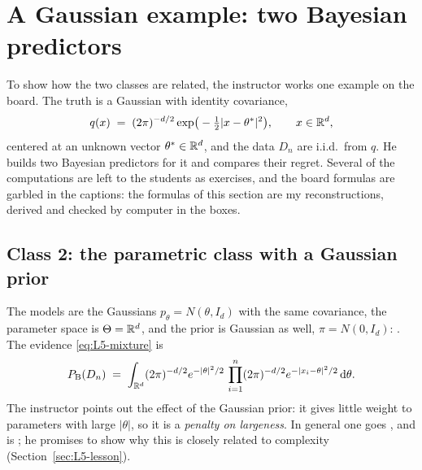 
\section{A Gaussian example: two Bayesian predictors}\label{sec:L5-gauss}
To show how the two classes are related, the instructor works one example on the board. The truth is a Gaussian with identity covariance,
\[
  q(x)\;=\;(2\pi)^{-d/2}\exp\!\big(-\tfrac12|x-\theta^*|^2\big),\qquad x\in\mathbb{R}^d,
\]
centered at an unknown vector $\theta^*\in\mathbb{R}^d$, and the data $D_n$ are i.i.d.\ from $q$. He builds two Bayesian predictors for it and compares their regret. Several of the computations are left to the students as exercises, and the board formulas are garbled in the captions: the formulas of this section are my reconstructions, derived and checked by computer in the boxes.

\subsection{Class 2: the parametric class with a Gaussian prior}\label{sec:L5-class2}
The models are the Gaussians $p_\theta=N(\theta,I_d)$ with the same covariance, the parameter space is $\Theta=\mathbb{R}^d$, and the prior is Gaussian as well, $\pi=N(0,I_d)$: . The evidence \eqref{eq:L5-mixture} is
\[
  P_{\mathrm{B}}(D_n)\;=\;\int_{\mathbb{R}^d}(2\pi)^{-d/2}e^{-|\theta|^2/2}\,\prod_{i=1}^n(2\pi)^{-d/2}e^{-|x_i-\theta|^2/2}\,\mathrm{d}\theta .
\]
The instructor points out the effect of the Gaussian prior: it gives little weight to parameters with large $|\theta|$, so it is a \emph{penalty on largeness}. In general one goes , and  is ; he promises to show why this is closely related to complexity (Section~\ref{sec:L5-lesson}).


